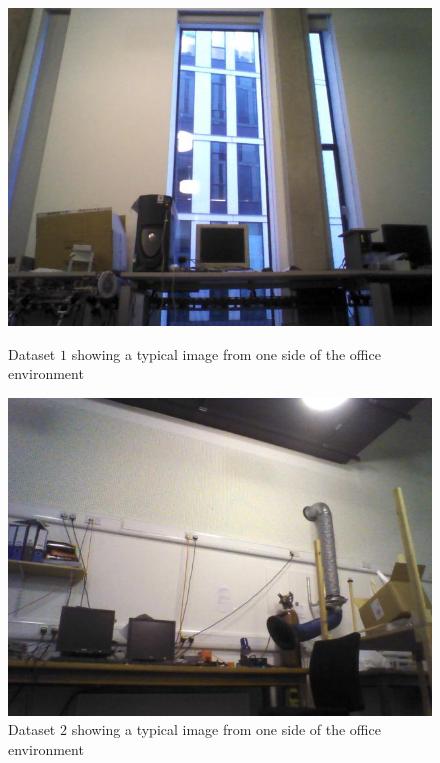 \begin{figure}[h!]
\begin{minipage}[b]{0.5\linewidth}
\includegraphics[scale=0.4]{../Drawings/datasetImages/dataset5.jpg}
\caption{Dataset $1$ showing a typical image from one side of the office environment}
\label{fig:dataset5}
\end{minipage}
\hspace{0.5cm}
\begin{minipage}[b]{0.5\linewidth}
\includegraphics[scale=0.4]{../Drawings/datasetImages/dataset6.jpg}
\caption{Dataset $2$ showing a typical image from one side of the office environment}
\label{fig:dataset6}
\end{minipage}
\end{figure}

